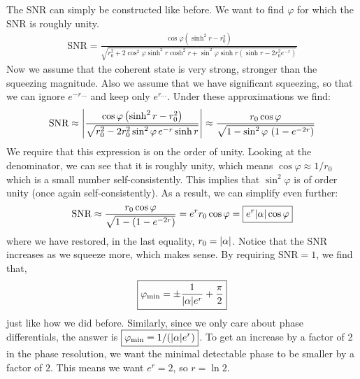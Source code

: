 \documentclass{article}
\theoremstyle{definition}
\newcommand{\al}{\alpha}
\newcommand{\f}[2]{\frac{#1}{#2}}
\newcommand{\lp}{\left(}
\newcommand{\rp}{\right)}
\begin{document}
\begin{enumerate}[label=(\alph*)]
The SNR can simply be constructed like before. We want to find $\varphi$ for which the SNR is roughly unity.
\begin{align*}
\text{SNR} =
\f{\cos\varphi \lp \sinh^2 r - r_0^2 \rp}
{\sqrt{r_0^2 +  2\cos^2 \varphi \sinh^2 r \cosh^2 r   +  \sin^2 \varphi \sinh r (\sinh r  - 2r_0^2 e^{-r})}}
\end{align*}
Now we assume that the coherent state is very strong, stronger than the squeezing magnitude. Also we assume that we have significant squeezing, so that we can ignore $e^{-r\dots }$ and keep only $e^{r\dots}$. Under these approximations we find:
\begin{align*}
\text{SNR} \approx 
\abs{\f{\cos\varphi \lp \sinh^2 r - r_0^2 \rp}
{\sqrt{r_0^2    - 2r_0^2  \sin^2 \varphi \,e^{-r} \sinh r }}}
\approx \f{{   r_0   \cos\varphi }}
{\sqrt{1    -  \sin^2 \varphi \, \lp 1- e^{-2r}\rp}}
\end{align*}
We require that this expression is on the order of unity. Looking at the denominator, we can see that it is roughly unity, which means $\cos\varphi \approx 1/r_0$ which is a small number self-consistently. This implies that $\sin^2\varphi$ is of order unity (once again self-consistently). As a result, we can simplify even further:
\begin{align*}
\text{SNR} \approx \f{r_0 \cos \varphi}{\sqrt{1-(1-e^{-2r})}} = e^r r_0 \cos\varphi = \boxed{e^r \abs{\al}\cos\varphi}
\end{align*}
where we have restored, in the last equality, $r_0 = \abs{\al}$. Notice that the SNR increases as we squeeze more, which makes sense. By requiring $\text{SNR} = 1$, we find that,
\begin{align*}
\boxed{\varphi_{\text{min}} = \pm \f{1}{\abs{\al}e^r} + \f{\pi}{2}}
\end{align*}
just like how we did before. Similarly, since we only care about phase differentials, the answer is $\boxed{ \varphi_\text{min} = 1/ (\abs{\al} e^{r} ) }$. To get an increase by a factor of 2 in the phase resolution, we want the minimal detectable phase to be smaller by a factor of $2$. This means we want $e^r = 2$, so $\boxed{r = \ln 2}$. 



\end{enumerate}
\end{document}
